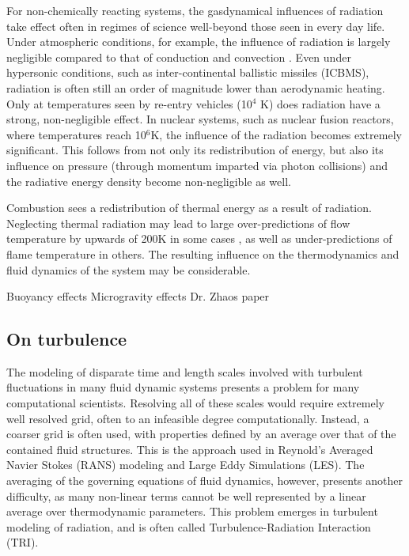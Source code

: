 For non-chemically reacting systems, the gasdynamical influences of radiation take effect often in regimes of science well-beyond those seen in every day life. Under atmospheric conditions, for example, the influence of radiation is largely negligible compared to that of conduction and convection \cite{Pai1966RadiationDynamics}.
Even under hypersonic conditions, such as inter-continental ballistic missiles (ICBMS), radiation is often still an order of magnitude lower than aerodynamic heating. Only at temperatures seen by re-entry vehicles (10$^4$ K) does radiation have a strong, non-negligible effect.
In nuclear systems, such as nuclear fusion reactors, where temperatures reach 10$^6$K, the influence of the radiation becomes extremely significant. This follows from not only its redistribution of energy, but also its influence on pressure (through momentum imparted via photon collisions) and the radiative energy density become non-negligible as well. 



Combustion sees a redistribution of thermal energy as a result of radiation. 
Neglecting thermal radiation may lead to large over-predictions of flow temperature by upwards of 200K in some cases \cite{Modest2016RadiativeSystems,Wu2021LimitationsFires,Coelho2018RadiativeSystems}, as well as under-predictions of flame temperature in others. The resulting influence on the thermodynamics and fluid dynamics of the system may be considerable.

Buoyancy effects
Microgravity effects
Dr. Zhaos paper



\subsection{On turbulence}
The modeling of disparate time and length scales involved with turbulent fluctuations in many fluid dynamic systems presents a problem for many computational scientists.
Resolving all of these scales would require extremely well resolved grid, often to an infeasible degree computationally. 
Instead, a coarser grid is often used, with properties defined by an average over that of the contained fluid structures. This is the approach used in Reynold's Averaged Navier Stokes (RANS) modeling and Large Eddy Simulations (LES).
The averaging of the governing equations of fluid dynamics, however, presents another difficulty, as many non-linear terms cannot be well represented by a linear average over thermodynamic parameters.
This problem emerges in turbulent modeling of radiation, and is often called Turbulence-Radiation Interaction (TRI).

